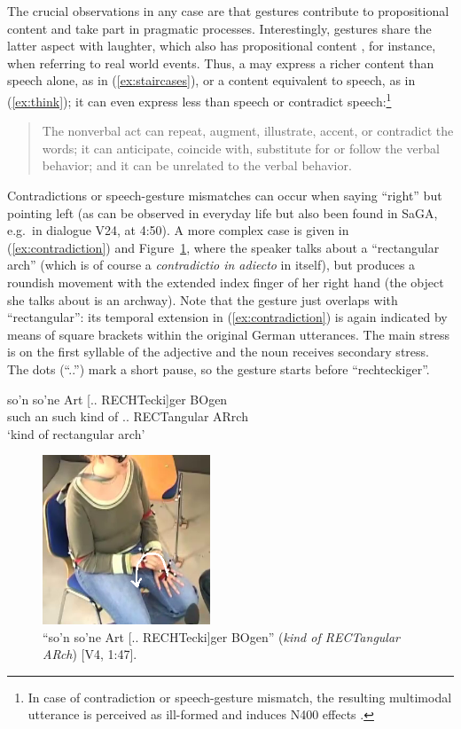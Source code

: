\documentclass[output=paper
                ,modfonts
                ,nonflat
	        ,collection
	        ,collectionchapter
	        ,collectiontoclongg
 	        ,biblatex
                ,babelshorthands
                ,newtxmath
                ,draftmode
                ,colorlinks, citecolor=brown
]{./langsci/langscibook}
\begin{document}
The crucial observations in any case are that gestures contribute to propositional content and take part in pragmatic processes.
%
Interestingly, gestures share the latter aspect with laughter, which also has propositional content \citep{Ginzburg:Breitholz:Cooper:Hough:Tian:2015}, for instance, when referring to real world events.
%
Thus, a  may express a richer content than speech alone, as in (\ref{ex:staircases}), or a content equivalent to speech, as in (\ref{ex:think}); it can even express less than speech or contradict speech:\footnote{In case of contradiction or speech-gesture mismatch, the resulting multimodal utterance is perceived as ill-formed and induces N400 effects \citep{Wu:Coulson:2005,Kelly:Kravitz:Hopkins:2004}.} 
%
\begin{quote}
The nonverbal act can repeat, augment, illustrate, accent, or contradict the words; it can anticipate, coincide with, substitute for or follow the verbal behavior; and it can be unrelated to the verbal behavior.\hfill 
\citep[53]{Ekman:Friesen:1969}
\end{quote}

Contradictions or speech-gesture mismatches can occur when saying \enquote{right} but pointing left (as can be observed in everyday life but also been found in SaGA, e.g.\ in dialogue V24, at 4:50).
%
A more complex case is given in (\ref{ex:contradiction}) and Figure~\ref{fig:contradiction}, where the speaker talks about a \enquote{rectangular arch} (which is of course a \textit{contradictio in adiecto} in itself), but produces a roundish movement with the extended index finger of her right hand (the object she talks about is an archway).
%
Note that the gesture just overlaps with \enquote{rectangular}: its temporal extension in (\ref{ex:contradiction}) is again indicated by means of square brackets within the original German utterances. 
%
The main stress is on the first syllable of the adjective and the noun receives secondary stress.
%
The dots (\enquote{..}) mark a short pause, so the gesture starts before \enquote{rechteckiger}.

\ea \label{ex:contradiction}
\gll 
 so'n so'ne Art {[.. RECHTecki]ger} BOgen \\
{such an} such {kind of} {.. RECTangular} ARrch \\
\glt 
\enquote*{kind of rectangular arch}
\z

\begin{figure}
  \centering
  \includegraphics[trim={2cm 0 0 3cm}, clip, width=5cm]{figures/rechteckiger-Bogen}
  \caption[Rectangular arch]{\enquote{so'n so'ne Art [.. RECHTecki]ger BOgen} (\textit{kind of RECTangular ARch}) [V4, 1:47].}
  \label{fig:contradiction}
\end{figure}
\end{document}
